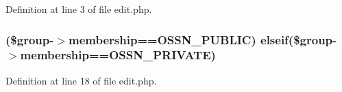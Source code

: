 Definition at line 3 of file edit.\+php.

\subsubsection[{\texorpdfstring{elseif}{elseif}}]{ (\$group-\/$>$membership=={\bf O\+S\+S\+N\+\_\+\+P\+U\+B\+L\+IC}) elseif(\$group-\/$>$membership=={\bf O\+S\+S\+N\+\_\+\+P\+R\+I\+V\+A\+TE})}\hypertarget{components_2_ossn_groups_2plugins_2default_2forms_2_ossn_groups_2edit_8php_a193e3a573c5e50b6f6604ac849466645}{}\label{components_2_ossn_groups_2plugins_2default_2forms_2_ossn_groups_2edit_8php_a193e3a573c5e50b6f6604ac849466645}


Definition at line 18 of file edit.\+php.

